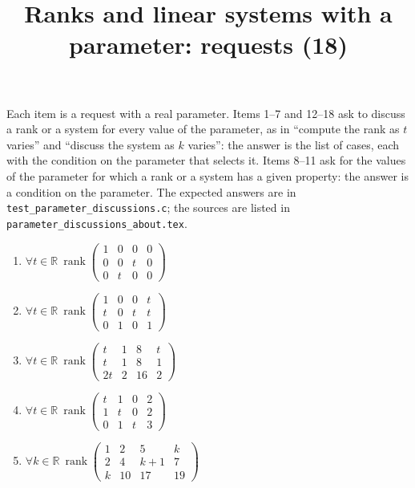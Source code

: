 \documentclass[11pt,a4paper]{article}
\title{Ranks and linear systems with a parameter: requests (18)}
\author{}
\date{}
\begin{document}
\maketitle
Each item is a request with a real parameter. Items 1--7 and 12--18 ask to discuss a rank or a system for every value of the parameter, as in ``compute the rank as $t$ varies'' and ``discuss the system as $k$ varies'': the answer is the list of cases, each with the condition on the parameter that selects it. Items 8--11 ask for the values of the parameter for which a rank or a system has a given property: the answer is a condition on the parameter. The expected answers are in \texttt{test\_parameter\_discussions.c}; the sources are listed in \texttt{parameter\_discussions\_about.tex}.

\begin{enumerate}
\item $\displaystyle \forall t \in \mathbb{R}\ \operatorname{rank} \begin{pmatrix} 1 & 0 & 0 & 0 \\ 0 & 0 & t & 0 \\ 0 & t & 0 & 0 \end{pmatrix}$
\item $\displaystyle \forall t \in \mathbb{R}\ \operatorname{rank} \begin{pmatrix} 1 & 0 & 0 & t \\ t & 0 & t & t \\ 0 & 1 & 0 & 1 \end{pmatrix}$
\item $\displaystyle \forall t \in \mathbb{R}\ \operatorname{rank} \begin{pmatrix} t & 1 & 8 & t \\ t & 1 & 8 & 1 \\ 2t & 2 & 16 & 2 \end{pmatrix}$
\item $\displaystyle \forall t \in \mathbb{R}\ \operatorname{rank} \begin{pmatrix} t & 1 & 0 & 2 \\ 1 & t & 0 & 2 \\ 0 & 1 & t & 3 \end{pmatrix}$
\item $\displaystyle \forall k \in \mathbb{R}\ \operatorname{rank} \begin{pmatrix} 1 & 2 & 5 & k \\ 2 & 4 & k + 1 & 7 \\ k & 10 & 17 & 19 \end{pmatrix}$

\end{enumerate}
\end{document}
